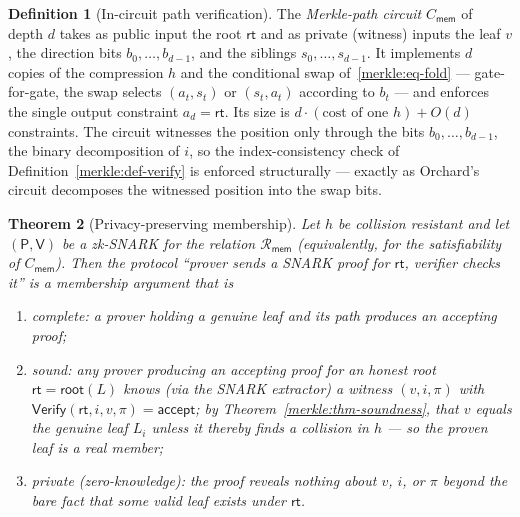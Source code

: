 \documentclass[11pt,a4paper]{article}
\newtheorem{theorem}{Theorem}[section]
\theoremstyle{definition}
\newtheorem{definition}[theorem]{Definition}
\theoremstyle{remark}
\begin{document}
\begin{definition}[In-circuit path verification]\label{merkle:def-circuit}
The \emph{Merkle-path circuit} \(C_{\mathsf{mem}}\) of depth \(d\) takes as public input the root \(\mathsf{rt}\) and as private (witness) inputs the leaf \(v\), the direction bits \(b_0, \dots, b_{d-1}\), and the siblings \(s_0, \dots, s_{d-1}\). It implements \(d\) copies of the compression \(h\) and the conditional swap of~\eqref{merkle:eq-fold} --- gate-for-gate, the swap selects \((a_t, s_t)\) or \((s_t, a_t)\) according to \(b_t\) --- and enforces the single output constraint \(a_d = \mathsf{rt}\). Its size is \(d \cdot (\text{cost of one } h) + O(d)\) constraints. The circuit witnesses the position only through the bits \(b_0, \dots, b_{d-1}\), the binary decomposition of \(i\), so the index-consistency check of Definition~\ref{merkle:def-verify} is enforced structurally --- exactly as Orchard's circuit decomposes the witnessed position into the swap bits.
\end{definition}

\begin{theorem}[Privacy-preserving membership]\label{merkle:thm-zk-membership}
Let \(h\) be collision resistant and let \((\mathsf{P}, \mathsf{V})\) be a zk-SNARK for the relation \(\mathcal{R}_{\mathsf{mem}}\) (equivalently, for the satisfiability of \(C_{\mathsf{mem}}\)). Then the protocol ``prover sends a SNARK proof for \(\mathsf{rt}\), verifier checks it'' is a membership argument that is
\begin{enumerate}
\item \emph{complete}: a prover holding a genuine leaf and its path produces an accepting proof;
\item \emph{sound}: any prover producing an accepting proof for an honest root \(\mathsf{rt} = \mathsf{root}(L)\) knows (via the SNARK extractor) a witness \((v,i,\pi)\) with \(\mathsf{Verify}(\mathsf{rt},i,v,\pi)=\mathsf{accept}\); by Theorem~\ref{merkle:thm-soundness}, that \(v\) equals the genuine leaf \(L_i\) unless it thereby finds a collision in \(h\) --- so the proven leaf is a real member;
\item \emph{private (zero-knowledge)}: the proof reveals nothing about \(v\), \(i\), or \(\pi\) beyond the bare fact that \emph{some} valid leaf exists under \(\mathsf{rt}\).
\end{enumerate}
\end{theorem}
\end{document}
